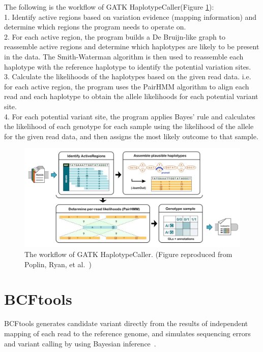 \documentclass[PhD]{PHlab-thesis}
\begin{document}
The following is the workflow of GATK HaplotypeCaller(Figure \ref{fig:GATK HaplotypeCaller}):\\
1. Identify active regions based on variation evidence (mapping information) and determine which regions the program needs to operate on.\\
2. For each active region, the program builds a De Bruijn-like graph to reassemble active regions and determine which haplotypes are likely to be present in the data. The Smith-Waterman algorithm is then used to reassemble each haplotype with the reference haplotype to identify the potential variation sites.\\
3. Calculate the likelihoods of the haplotypes based on the given read data. i.e. for each active region, the program uses the PairHMM algorithm to align each read and each haplotype to obtain the allele likelihoods for each potential variant site.\\
4. For each potential variant site, the program applies Bayes' rule and calculates the likelihood of each genotype for each sample using the likelihood of the allele for the given read data, and then assigns the most likely outcome to that sample.

\begin{figure}[h!]
	\centering
	\includegraphics[scale=0.25]{figures/GATK HaplotypeCaller.png}
	\caption{The workflow of GATK HaplotypeCaller. (Figure reproduced from Poplin, Ryan, et al.~\cite{Poplin2018GH})}
	\label{fig:GATK HaplotypeCaller} %
\end{figure}

\section{BCFtools}
BCFtools generates candidate variant directly from the results of independent mapping of each read to the reference genome, and simulates sequencing errors and variant calling by using Bayesian inference~\cite{Li2011SAMtools, Li2010SAMtools}.
\end{document}
